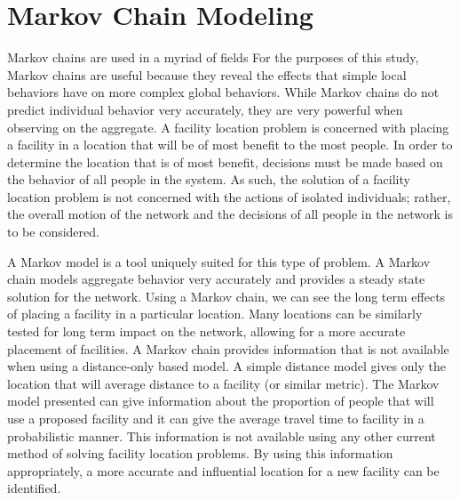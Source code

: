 \documentclass[twoside,twocolumn]{article}
\begin{document}





\section{Markov Chain Modeling}

Markov chains are used in a myriad of fields
For the purposes of this study, Markov chains are useful because they reveal the effects that simple local behaviors have on more complex global behaviors.
While Markov chains do not predict individual behavior very accurately, they are very powerful when observing on the aggregate.
A facility location problem is concerned with placing a facility in a location that will be of most benefit to the most people.
In order to determine the location that is of most benefit, decisions must be made based on the behavior of all people in the system.
As such, the solution of a facility location problem is not concerned with the actions of isolated individuals; rather, the overall motion of the network and the decisions of all people in the network is to be considered.

A Markov model is a tool uniquely suited for this type of problem.
A Markov chain models aggregate behavior very accurately and provides a steady state solution for the network. 
Using a Markov chain, we can see the long term effects of placing a facility in a particular location.
Many locations can be similarly tested for long term impact on the network, allowing for a more accurate placement of facilities.
A Markov chain provides information that is not available when using a distance-only based model.  
A simple distance model gives only the location that will average distance to a facility (or similar metric).
The Markov model presented can give information about the proportion of people that will use a proposed facility and it can give the average travel time to facility in a probabilistic manner.
This information is not available using any other current method of solving facility location problems. %
By using this information appropriately, a more accurate and influential location for a new facility can be identified.
\end{document}
